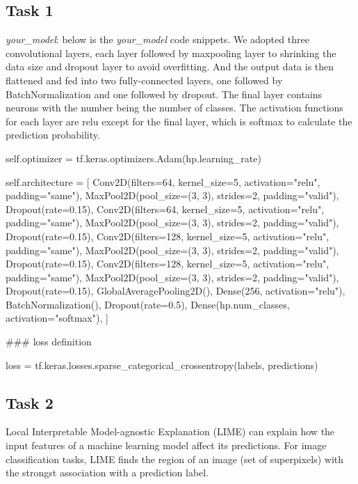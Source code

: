 \subsection*{Task 1}
\emph{your\_model}: below is the \textit{your\_model} code snippets. We adopted three convolutional layers, each layer followed by maxpooling layer to shrinking the data size and dropout layer to avoid overfitting. And the output data is then flattened and fed into two fully-connected layers, one followed by BatchNormalization and one followed by dropout. The final layer contains neurons with the number being the number of classes. The activation functions for each layer are relu except for the final layer, which is softmax to calculate the prediction probability.
          \begin{python}
self.optimizer = tf.keras.optimizers.Adam(hp.learning_rate)

self.architecture = [
    Conv2D(filters=64, kernel_size=5, activation="relu", padding="same"),
    MaxPool2D(pool_size=(3, 3), strides=2, padding="valid"),
    Dropout(rate=0.15),
    Conv2D(filters=64, kernel_size=5, activation="relu", padding="same"),
    MaxPool2D(pool_size=(3, 3), strides=2, padding="valid"),
    Dropout(rate=0.15),
    Conv2D(filters=128, kernel_size=5, activation="relu", padding="same"),
    MaxPool2D(pool_size=(3, 3), strides=2, padding="valid"),
    Dropout(rate=0.15),
    Conv2D(filters=128, kernel_size=5, activation="relu", padding="same"),
    MaxPool2D(pool_size=(3, 3), strides=2, padding="valid"),
    Dropout(rate=0.15),
    GlobalAveragePooling2D(),
    Dense(256, activation="relu"),
    BatchNormalization(),
    Dropout(rate=0.5),
    Dense(hp.num_classes, activation="softmax"),
]

### loss definition

loss = tf.keras.losses.sparse_categorical_crossentropy(labels, predictions)
          \end{python}

\subsection*{Task 2}
Local Interpretable Model-agnostic Explanation (LIME) can explain how the input features of a machine learning model affect its predictions. For image classification tasks, LIME finds the region of an image (set of superpixels) with the strongst association with a prediction label.

